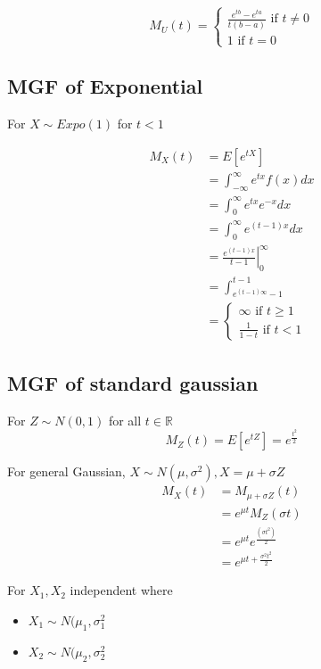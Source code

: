 \[
  M_U(t) = 
  \begin{cases}
     \frac{e^{tb} - e^{ta} }{t(b-a)} \text{ if } t \neq 0 \\
     1 \text{ if } t = 0
  \end{cases}
\] 

\subsection{MGF of Exponential}
For $X \sim Expo(1)$ for  $t < 1$

 \begin{align*}
    M_X(t) &= E\left[ e^{tX}\right]  \\
           &= \int_{-\infty}^{\infty}  e^{tx} f(x) dx \\
           &= \int_{0}^{\infty} e^{tx} e^{-x} dx \\
           &= \int_{0}^{\infty}  e^{(t-1)x } dx \\
           &= \left. \frac{e^{(t-1)x}}{t - 1} \right|_{0}^{\infty}   \\
           &= \int_{e^{(t-1) \infty} - 1}^{t - 1}   \\
           &= 
           \begin{cases} 
              \infty \text{ if } t \geq 1 \\
              \frac{1}{1 - t} \text{ if } t < 1
           \end{cases}
\end{align*}

\subsection{MGF of standard gaussian}
For $Z \sim N(0, 1)$ for all $t \in \mathbb{R}$
\[
   M_Z(t) = E\left[ e^{tZ}\right]  = e^{ \frac{t^2}{2}}
\] 

For general Gaussian, $X \sim N(\mu, \sigma^2), X = \mu + \sigma Z$
\begin{align*}
   M_X(t) &= M_{\mu + \sigma Z} (t) \\
          &= e^{\mu t} M_Z(\sigma t) \\
          &= e^{\mu t} e^{ \frac{(\sigma t^2)}{2}} \\
          &= e^{\mu t + \frac{\sigma^2 t^2}{2}}
\end{align*}

For $X_1, X_2$ independent where
\begin{itemize}
   \item $X_1 \sim N(\mu_1, \sigma_1^2$ 
   \item $X_2 \sim N(\mu_2, \sigma_2^2$ 
\end{itemize}


